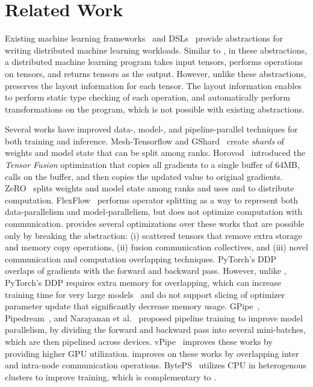 \section{Related Work}
\label{sec:related}

Existing machine learning frameworks~\cite{mxnet,tensorflow,jia2014caffe,pytorch,sergeev2018horovod} and DSLs~\cite{tvm18,distributed-halide} provide abstractions for writing distributed machine learning workloads.
Similar to \tool, in these abstractions, a distributed machine learning program takes input tensors, performs operations on tensors, and returns tensors as the output.
However, unlike these abstractions, \tool preserves the layout information for each tensor.
The layout information enables \tool to perform static type checking of each operation, and automatically perform transformations on the program, which is not possible with existing abstractions.

Several works have improved data-, model-, and pipeline-parallel techniques for both training and inference.
Mesh-Tensorflow \cite{meshtensorflow} and GShard~\cite{gshard} create \emph{shards} of weights and model state that can be split among ranks.
Horovod~\cite{sergeev2018horovod} introduced the \emph{Tensor Fusion} optimization that copies all gradients to a single buffer of 64MB, calls \allreduce on the buffer, and then copies the updated value to original gradients.
ZeRO~\cite{zero} splits weights and model state among ranks and uses \reducescatter and \allgather to distribute computation.
FlexFlow~\cite{flexflow} performs operator splitting as a way to represent both data-parallelism and model-parallelism, but does not optimize computation with communication.
\tool provides several optimizations over these works that are possible only by breaking the abstraction: (i) scattered tensors that remove extra storage and memory copy operations, (ii) fusion communication collectives, and (iii) novel communication and computation overlapping techniques.
PyTorch's DDP~\cite{pytorch-ddp} overlaps \allreduce of gradients with the forward and backward pass.
However, unlike \tool, PyTorch's DDP requires extra memory for overlapping, which can increase training time for very large models~\cite{megatronlm-github} and do not support slicing of optimizer parameter update that significantly decrease memory usage.
GPipe~\cite{gpipe}, Pipedream~\cite{pipedream}, and Narayanan et al.~\cite{narayanan2021efficient} proposed pipeline training to improve model parallelism, by dividing the forward and backward pass into several mini-batches, which are then pipelined across devices.
vPipe~\cite{vpipe} improves these works by providing higher GPU utilization.
\tool improves on these works by overlapping inter and intra-node communication operations.
BytePS~\cite{osdi20:byteps} utilizes CPU in heterogenous clusters to improve training, which is complementary to \tool.

